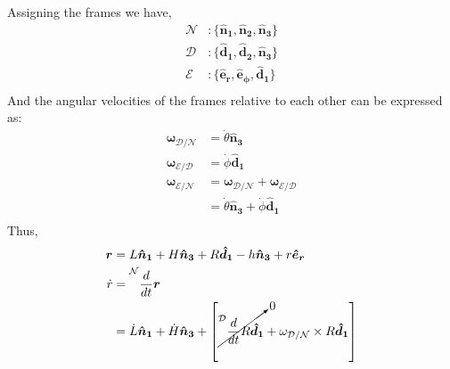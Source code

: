 \begin{example}
	Assigning the frames we have,
	\[
		\begin{aligned}
			\mathcal{N} & \colon  \{ \bm{{\hat{n}_{1}}} , \bm{{\hat{n}_{2}}} , \bm{{\hat{n}_{3}}}  \}     \\
			\mathcal{D} & \colon  \{ \bm{{\hat{d}_{1}}} , \bm{{\hat{d}_{2}}} , \bm{{\hat{n}_{3}}}  \}     \\
			\mathcal{E} & \colon  \{ \bm{{\hat{e}_{r}}} , \bm{{\hat{e}_{\phi }}} , \bm{{\hat{d}_{1}}}  \} \\
		\end{aligned}
	\]
	And the angular velocities of the frames relative to each other can be expressed as:
	\[
		\begin{aligned}
			\bm{\omega _{\mathcal{D} / \mathcal{N} }} & = \dot{ \theta} \bm{{\hat{n}_{3}}}                                                    \\
			\bm{\omega _{\mathcal{E} / \mathcal{D} }} & = \dot{ \phi} \bm{{\hat{d}_{1}}}                                                      \\
			\bm{\omega _{\mathcal{E} / \mathcal{N} }} & = \bm{\omega _{\mathcal{D} / \mathcal{N} }}+\bm{\omega _{\mathcal{E} / \mathcal{D} }} \\
			                                          & = \dot{\theta } \bm{{\hat{n}_{3}}} + \dot{\phi } \bm{{\hat{d}_{1}}}                   \\
		\end{aligned}
	\]
	Thus,
	\[
		\begin{aligned}
			\bm{r}  & = L \bm{{\hat{n}_{1}}} + H \bm{{\hat{n}_{3}}} + R \bm{{\hat{d}_{1}}} - h \bm{{\hat{n}_{3}}}  + r \bm{{\hat{e}_{r}}} \\
			\dot{r} & = \prescript{\mathcal{N}}{}{\frac{d}{dt}}\bm{r}                                                                     \\
			        & = \dot{L} \bm{{\hat{n}_{1}}} + \dot{H} \bm{{\hat{n}_{3}}} +
			\left[ \cancelto{0}{
					\prescript{\mathcal{D}}{}{\frac{d}{dt}}R \bm{{\hat{d}_{1}}}
				} + \omega_{\mathcal{D} / \mathcal{N} } \times R \bm{{\hat{d}_{1}}}
				\right]
		\end{aligned}
	\]
\end{example}

